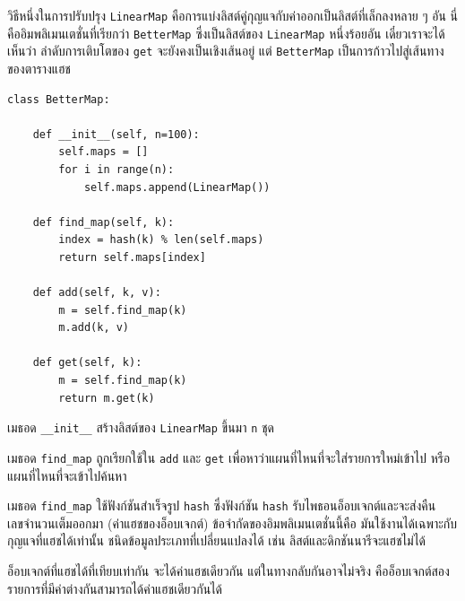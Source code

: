 วิธีหนึ่งในการปรับปรุง {\tt LinearMap} คือการแบ่งลิสต์คู่กุญแจกับค่าออกเป็นลิสต์ที่เล็กลงหลาย ๆ อัน
นี่คืออิมพลิเมนเตชั่นที่เรียกว่า {\tt BetterMap} 
ซึ่งเป็นลิสต์ของ \texttt{LinearMap} หนึ่งร้อยอัน
เดี๋ยวเราจะได้เห็นว่า
ลำดับการเติบโตของ \texttt{get} จะยังคงเป็นเชิงเส้นอยู่
แต่ \texttt{BetterMap} เป็นการก้าวไปสู่เส้นทางของตารางแฮช

\begin{verbatim}
class BetterMap:

    def __init__(self, n=100):
        self.maps = []
        for i in range(n):
            self.maps.append(LinearMap())

    def find_map(self, k):
        index = hash(k) % len(self.maps)
        return self.maps[index]

    def add(self, k, v):
        m = self.find_map(k)
        m.add(k, v)

    def get(self, k):
        m = self.find_map(k)
        return m.get(k)
\end{verbatim}

เมธอด \verb"__init__" สร้างลิสต์ของ {\tt LinearMap} ขึ้นมา {\tt n} ชุด


เมธอด \verb"find_map" ถูกเรียกใช้ใน {\tt add} และ {\tt get} เพื่อหาว่าแผนที่ไหนที่จะใส่รายการใหม่เข้าไป หรือแผนที่ไหนที่จะเข้าไปค้นหา


เมธอด \verb"find_map" ใช้ฟังก์ชันสำเร็จรูป {\tt hash}
ซึ่งฟังก์ชัน \texttt{hash} รับไพธอนอ็อบเจกต์และจะส่งคืนเลขจำนวนเต็มออกมา (ค่าแฮชของอ็อบเจกต์)
ข้อจำกัดของอิมพลิเมนเตชั่นนี้คือ
มันใช้งานได้เฉพาะกับกุญแจที่แฮชได้เท่านั้น 
ชนิดข้อมูลประเภทที่เปลี่ยนแปลงได้ เช่น ลิสต์และดิกชันนารีจะแฮชไม่ได้ 


อ็อบเจกต์ที่แฮชได้ที่เทียบเท่ากัน จะได้ค่าแฮชเดียวกัน 
แต่ในทางกลับกันอาจไม่จริง คืออ็อบเจกต์สองรายการที่มีค่าต่างกันสามารถได้ค่าแฮชเดียวกันได้

